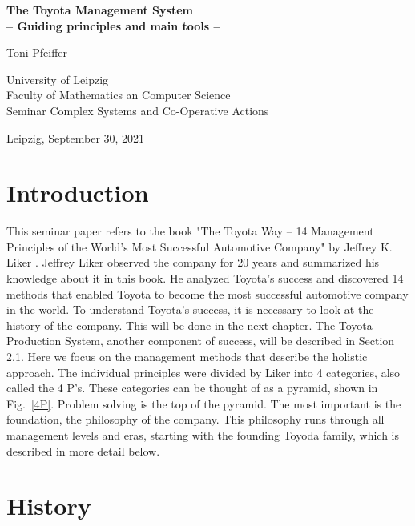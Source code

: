 \documentclass[a4paper,11pt]{article}
\begin{document}
\begin{titlepage}
\begin{center}\large
\vspace*{5cm}
{\LARGE \bfseries The Toyota Management System   }\\[12pt]
{\bfseries -- Guiding principles and main tools --}
\vskip3cm

Toni Pfeiffer 
\vfill

University of Leipzig \\[12pt]
Faculty of Mathematics an Computer Science \\[6pt]
Seminar Complex Systems and Co-Operative Actions

\vfill

Leipzig, September 30, 2021

\end{center}
\end{titlepage}
\clearpage
\tableofcontents
\clearpage

\section{Introduction}

This seminar paper refers to the book "The Toyota Way -- 14 Management
Principles of the World's Most Successful Automotive Company" by Jeffrey
K. Liker \cite{toyota_book}. Jeffrey Liker observed the company for 20 years
and summarized his knowledge about it in this book. He analyzed Toyota's
success and discovered 14 methods that enabled Toyota to become the most
successful automotive company in the world. To understand Toyota's success, it
is necessary to look at the history of the company. This will be done in the
next chapter. The Toyota Production System, another component of success, will
be described in Section 2.1. Here we focus on the management methods that
describe the holistic approach. The individual principles were divided by
Liker into 4 categories, also called the 4 P's. These categories can be
thought of as a pyramid, shown in Fig.~\ref{4P}. Problem solving is the top of
the pyramid. The most important is the foundation, the philosophy of the
company. This philosophy runs through all management levels and eras, starting
with the founding Toyoda family, which is described in more detail below.
\clearpage

\section{History}
\end{document}
